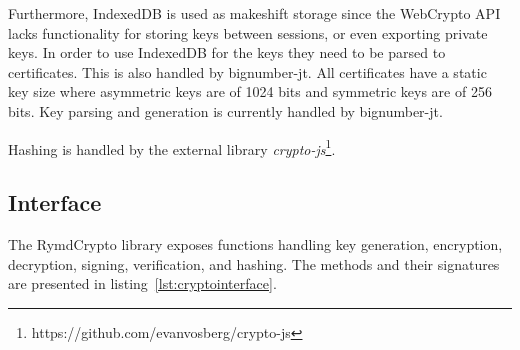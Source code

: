 Furthermore, IndexedDB is used as makeshift storage since the WebCrypto API lacks functionality for storing keys between sessions, or even exporting private keys. In order to use IndexedDB for the keys they need to be parsed to certificates. This is also handled by bignumber-jt. All certificates have a static key size where asymmetric keys are of 1024 bits and symmetric keys are of 256 bits. Key parsing and generation is currently handled by bignumber-jt.

Hashing is handled by the external library \emph{crypto-js}\footnote{https://github.com/evanvosberg/crypto-js}.

\subsection{Interface}

The RymdCrypto library exposes functions handling key generation, encryption, decryption, signing, verification, and hashing. The methods and their signatures are presented in listing~\ref{lst:cryptointerface}.

